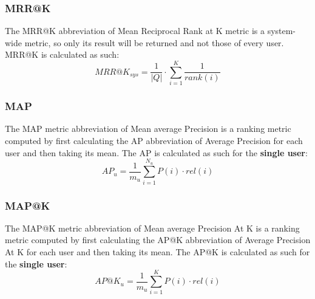 \subsubsection{MRR@K}\label{subsubsec:mrr-k}
The MRR@K abbreviation of Mean Reciprocal Rank at K metric is a system-wide metric, so only its result will be returned
and not those of every user.
MRR@K is calculated as such:
\hfill\break
\hfill\break
    \[
        MRR@K_{sys} = \frac{1}{|Q|}\cdot\sum_{i=1}^{K}\frac{1}{rank(i)}
    \]
\hfill\break


\subsubsection{MAP}\label{subsubsec:map}
The MAP metric abbreviation of Mean average Precision is a ranking metric computed by first calculating the AP
abbreviation of Average Precision for each user and then taking its mean.
The AP is calculated as such for the \textbf{single user}:
\hfill\break
\hfill\break
    \[
        AP_u = \frac{1}{m_u}\sum_{i=1}^{N_u}P(i)\cdot rel(i)
    \]
\hfill\break


\subsubsection{MAP@K}\label{subsubsec:map-k}
The MAP@K metric abbreviation of Mean average Precision At K is a ranking metric computed by first calculating the
AP@K abbreviation of Average Precision At K for each user and then taking its mean.
The AP@K is calculated as such for the \textbf{single user}:
\hfill\break
\hfill\break
    \[
        AP@K_u = \frac{1}{m_u}\sum_{i=1}^{K}P(i)\cdot rel(i)
    \]
\hfill\break


